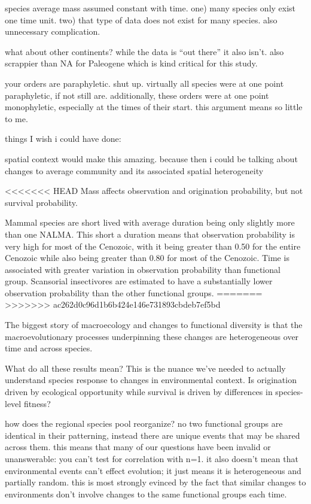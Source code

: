 \documentclass[12pt,letterpaper]{article}
\begin{document}
species average mass assumed constant with time. one) many species only exist one time unit. two) that type of data does not exist for many species. also unnecessary complication.

what about other continents? while the data is ``out there'' it also isn't. also scrappier than NA for Paleogene which is kind critical for this study.

your orders are paraphyletic. shut up. virtually all species were at one point paraphyletic, if not still are. additionally, these orders were at one point monophyletic, especially at the times of their start. this argument means so little to me.



things I wish i could have done:

spatial context would make this amazing. because then i could be talking about changes to average community and its associated spatial heterogeneity





<<<<<<< HEAD
Mass affects observation and origination probability, but not survival probability.



Mammal species are short lived with average duration being only slightly more than one NALMA. This short a duration means that observation probability is very high for most of the Cenozoic, with it being greater than 0.50 for the entire Cenozoic while also being greater than 0.80 for most of the Cenozoic. Time is associated with greater variation in observation probability than functional group. Scansorial insectivores are estimated to have a substantially lower observation probability than the other functional groups.
=======
>>>>>>> ac262d0c96d1b6b424e146e731893cbdeb7ef5bd


The biggest story of macroecology and changes to functional diversity is that the macroevolutionary processes underpinning these changes are heterogeneous over time and across species. 

What do all these results mean? This is the nuance we've needed to actually understand species response to changes in environmental context. Is origination driven by ecological opportunity while survival is driven by differences in species-level fitness?

how does the regional species pool reorganize? no two functional groups are identical in their patterning, instead there are unique events that may be shared across them. this means that many of our questions have been invalid or unanswerable: you can't test for correlation with n=1. it also doesn't mean that environmental events can't effect evolution; it just means it is heterogeneous and partially random. this is most strongly evinced by the fact that similar changes to environments don't involve changes to the same functional groups each time.
\end{document}
